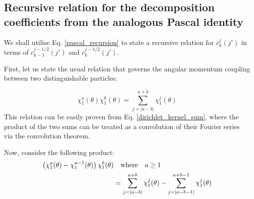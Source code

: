 \documentclass[12pt]{article}
\begin{document}
	\subsection{Recursive relation for the decomposition coefficients from the analogous Pascal identity}
	We shall utilise Eq. \ref{pascal_recursion} to state a recursive relation for $c^j_k(j')$ in terms of $c^{j-1/2}_{k-1}(j')$ and $c^{j-1/2}_{k}(j')$.
	
	First, let us state the usual relation that governs the angular momentum coupling between two distinguishable particles:
	
	\begin{equation} \label{distinguishable_particle_coupling_decomposition}
	\chi^a_1(\theta)\chi^b_1(\theta)=\sum_{j=|a-b|}^{a+b} \chi^j_1(\theta)
	\end{equation}
	This relation can be easily proven from Eq. \ref{dirichlet_kernel_sum}, where the product of the two sums can be treated as a convolution of their Fourier series via the convolution theorem.
	
	Now, consider the following product:
	\begin{align}
	\left(\chi^a_1(\theta)-\chi^{a-1}_1(\theta)\right)\chi^b_1(\theta)&\qq{where}a\geq 1\nonumber\\
	&= \sum_{j=|a-b|}^{a+b}\chi^j_1(\theta)-\sum_{j=|a-b-1|}^{a+b-1}\chi^j_1(\theta)
	\end{align}
	
\end{document}
